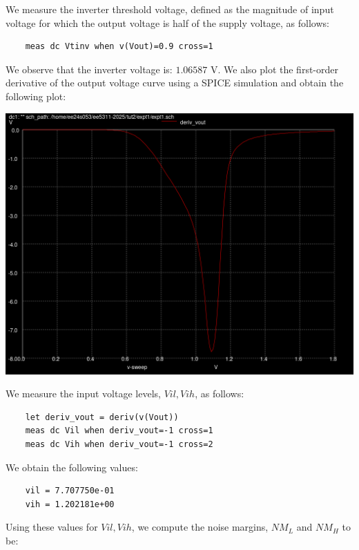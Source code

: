 \documentclass[10pt,a4paper]{article}
\begin{document}
\noindent We measure the inverter threshold voltage, defined as the magnitude of input voltage for which the output voltage is half of the supply voltage, as follows:

\begin{verbatim}
    meas dc Vtinv when v(Vout)=0.9 cross=1
\end{verbatim}

\noindent We observe that the inverter voltage is: $1.06587$ V.\newline
We also plot the first-order derivative of the output voltage curve using a SPICE simulation and obtain the following plot:

\begin{center}
\includegraphics[scale=0.3]{tut2/reports/media/expt1_deriv_vout.png}
\end{center}

\noindent We measure the input voltage levels, $Vil, Vih$, as follows:

\begin{verbatim}
    let deriv_vout = deriv(v(Vout))
    meas dc Vil when deriv_vout=-1 cross=1
    meas dc Vih when deriv_vout=-1 cross=2
\end{verbatim}

\noindent We obtain the following values:

\begin{verbatim}
    vil = 7.707750e-01
    vih = 1.202181e+00
\end{verbatim}

\noindent Using these values for $Vil, Vih$, we compute the noise margins, $NM_{L}$ and $NM_{H}$ to be:
\end{document}
